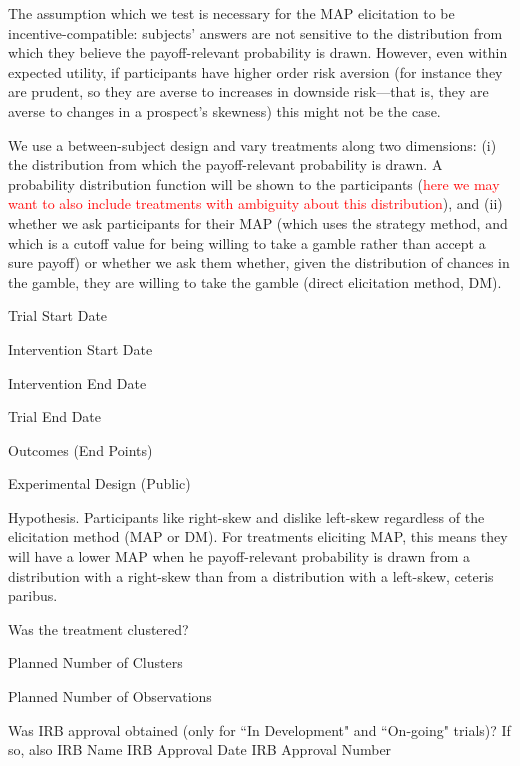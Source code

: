 The assumption which we test is necessary for the MAP elicitation to be incentive-compatible: subjects' answers are not sensitive to the distribution from which they believe the payoff-relevant probability is drawn.
However, even within expected utility, if participants have higher order risk aversion (for instance they are prudent, so they are averse to increases in downside risk---that is, they are averse to changes in a prospect's skewness) this might not be the case.


We use a between-subject design and vary treatments along two dimensions: (i) the distribution from which the payoff-relevant probability is drawn. A probability distribution function will be shown to the participants (\textcolor{red}{here we may want to also include treatments with ambiguity about this distribution}), and (ii) whether we ask participants for their MAP (which uses the strategy method, and which is a cutoff value for being willing to take a gamble rather than accept a sure payoff) or whether we ask them whether, given the distribution of chances in the gamble, they are willing to take the gamble (direct elicitation method, DM).
    
    Trial Start Date
    
    Intervention Start Date
    
    Intervention End Date
    
    Trial End Date
    
    Outcomes (End Points)
    
    Experimental Design (Public)
    
    Hypothesis.  Participants like right-skew and dislike left-skew regardless of the elicitation method (MAP or DM). For treatments eliciting MAP, this means they will have a lower MAP when he payoff-relevant probability is drawn from a distribution with a right-skew than from a distribution with a left-skew, ceteris paribus.
    
    Was the treatment clustered?
    
    Planned Number of Clusters
    
    Planned Number of Observations
    
    Was IRB approval obtained (only for ``In Development" and ``On-going" trials)? If so, also
        IRB Name
        IRB Approval Date
        IRB Approval Number






\clearpage
\pagebreak





